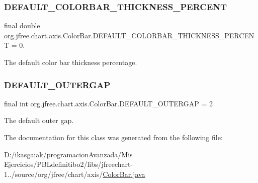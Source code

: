 \subsubsection{\texorpdfstring{D\+E\+F\+A\+U\+L\+T\+\_\+\+C\+O\+L\+O\+R\+B\+A\+R\+\_\+\+T\+H\+I\+C\+K\+N\+E\+S\+S\+\_\+\+P\+E\+R\+C\+E\+NT}{DEFAULT\_COLORBAR\_THICKNESS\_PERCENT}}
{\footnotesize\ttfamily final double org.\+jfree.\+chart.\+axis.\+Color\+Bar.\+D\+E\+F\+A\+U\+L\+T\+\_\+\+C\+O\+L\+O\+R\+B\+A\+R\+\_\+\+T\+H\+I\+C\+K\+N\+E\+S\+S\+\_\+\+P\+E\+R\+C\+E\+NT = 0.\hspace{0.3cm}{\ttfamily [static]}}

The default color bar thickness percentage. \mbox{\label{classorg_1_1jfree_1_1chart_1_1axis_1_1_color_bar_a17325c044b868f2d7dbf658b2cf5991a}} 
\subsubsection{\texorpdfstring{D\+E\+F\+A\+U\+L\+T\+\_\+\+O\+U\+T\+E\+R\+G\+AP}{DEFAULT\_OUTERGAP}}
{\footnotesize\ttfamily final int org.\+jfree.\+chart.\+axis.\+Color\+Bar.\+D\+E\+F\+A\+U\+L\+T\+\_\+\+O\+U\+T\+E\+R\+G\+AP = 2\hspace{0.3cm}{\ttfamily [static]}}

The default outer gap. 

The documentation for this class was generated from the following file\+:\begin{DoxyCompactItemize}
\item 
D\+:/ikasgaiak/programacion\+Avanzada/\+Mis Ejercicios/\+P\+B\+Ldefinitibo2/libs/jfreechart-\/1../source/org/jfree/chart/axis/\mbox{\hyperlink{_color_bar_8java}{Color\+Bar.\+java}}\end{DoxyCompactItemize}
